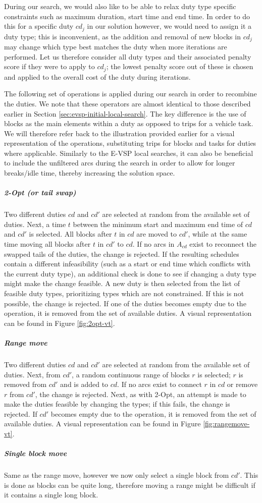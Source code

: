 \documentclass[]{article}
\begin{document}
During our search, we would also like to be able to relax duty type specific constraints such as maximum duration, start time and end time. In order to do this for a specific duty $cd_j$ in our solution however, we would need to assign it a duty type; this is inconvenient, as the addition and removal of new blocks in $cd_j$ may change which type best matches the duty when more iterations are performed. Let us therefore consider all duty types and their associated penalty score if they were to apply to $cd_j$; the lowest penalty score out of these is chosen and applied to the overall cost of the duty during iterations. 

The following set of operations is applied during our search in order to recombine the duties. We note that these operators are almost identical to those described earlier in Section \ref{sec:evsp-initial-local-search}. The key difference is the use of blocks as the main elements within a duty as opposed to trips for a vehicle task. We will therefore refer back to the illustration provided earlier for a visual representation of the operations, substituting trips for blocks and tasks for duties where applicable. Similarly to the E-VSP local searches, it can also be beneficial to include the unfiltered arcs during the search in order to allow for longer breaks/idle time, thereby increasing the solution space.

\noindent\subparagraph{2-Opt (or tail swap)} Two different duties $cd$ and $cd'$ are selected at random from the available set of duties. Next, a time $t$ between the minimum start and maximum end time of $cd$ and $cd'$ is selected. All blocks after $t$ in $cd$ are moved to $cd'$, while at the same time moving all blocks after $t$ in $cd'$ to $cd$. If no arcs in $A_{cd}$ exist to reconnect the swapped tails of the duties, the change is rejected. If the resulting schedules contain a different infeasibility (such as a start or end time which conflicts with the current duty type), an additional check is done to see if changing a duty type might make the change feasible. A new duty is then selected from the list of feasible duty types, prioritizing types which are not constrained. If this is not possible, the change is rejected. If one of the duties becomes empty due to the operation, it is removed from the set of available duties. A visual representation can be found in Figure \ref{fig:2opt-vt}.
\noindent\subparagraph{Range move} Two different duties $cd$ and $cd'$ are selected at random from the available set of duties. Next, from $cd'$, a random continuous range of blocks $r$ is selected; $r$ is removed from $cd'$ and is added to $cd$. If no arcs exist to connect $r$ in $cd$ or remove $r$ from $cd'$, the change is rejected. Next, as with 2-Opt, an attempt is made to make the duties feasible by changing the types; if this fails, the change is rejected. If $cd'$ becomes empty due to the operation, it is removed from the set of available duties. A visual representation can be found in Figure \ref{fig:rangemove-vt}.
\noindent\subparagraph{Single block move} Same as the range move, however we now only select a single block from $cd'$. This is done as blocks can be quite long, therefore moving a range might be difficult if it contains a single long block. \\
\end{document}
